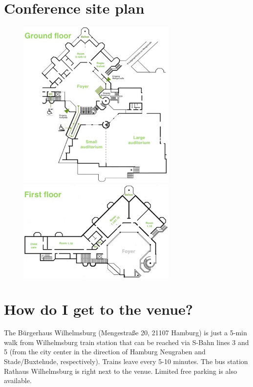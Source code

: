 
\setlength{\parskip}{1em}   

\section*{Conference site plan}

\begin{figure}[H]
	\centering
	\includegraphics[width=0.7\textwidth]{tex/images/infos/ground_floor.png}
	\includegraphics[width=0.7\textwidth]{tex/images/infos/first_floor.png}
\end{figure}


\section*{How do I get to the venue?}

The Bürgerhaus Wilhelmsburg (Mengestraße 20, 21107 Hamburg) is just a 5-min walk from Wilhelmsburg train station that can be reached via S-Bahn lines 3 and 5 (from the city center in the direction of Hamburg Neugraben and Stade/Buxtehude, respectively). Trains leave every 5-10 minutes. 
The bus station Rathaus Wilhelmsburg is right next to the venue. 
Limited free parking is also available.

